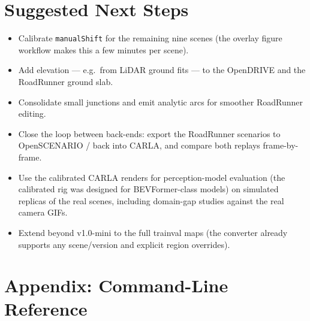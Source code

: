 \documentclass[11pt]{article}
\newcommand{\code}[1]{{\setlength{\fboxsep}{1.5pt}\colorbox{codegray}{\small\texttt{#1}}}}
\begin{document}
\section{Suggested Next Steps}
\begin{itemize}
\item Calibrate \code{manualShift} for the remaining nine scenes (the overlay figure
      workflow makes this a few minutes per scene).
\item Add elevation --- e.g.\ from LiDAR ground fits --- to the OpenDRIVE and the
      RoadRunner ground slab.
\item Consolidate small junctions and emit analytic arcs for smoother RoadRunner
      editing.
\item Close the loop between back-ends: export the RoadRunner scenarios to
      OpenSCENARIO / back into CARLA, and compare both replays frame-by-frame.
\item Use the calibrated CARLA renders for perception-model evaluation (the
      calibrated rig was designed for BEVFormer-class models) on simulated replicas of
      the real scenes, including domain-gap studies against the real camera GIFs.
\item Extend beyond v1.0-mini to the full trainval maps (the converter already supports
      any scene/version and explicit region overrides).
\end{itemize}

\appendix
\section{Appendix: Command-Line Reference}
\end{document}
